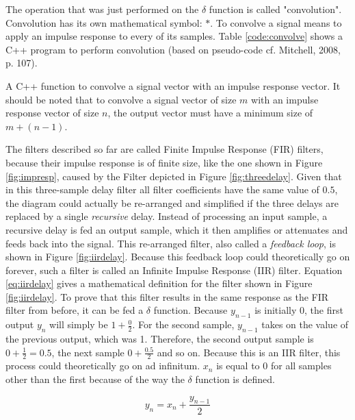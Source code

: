 \noindent The operation that was just performed on the $\delta$ function is called "convolution". Convolution has its own mathematical symbol: $\ast$. To convolve a signal means to apply an impulse response to every of its samples. Table \ref{code:convolve} shows a C++ program to perform convolution (based on pseudo-code cf. Mitchell, 2008, p. 107).\\

\begin{table}
  \caption{A C++ function to convolve a signal vector with an impulse response vector. It should be noted that to convolve a signal vector of size $m$ with an impulse response vector of size $n$, the output vector must have a minimum size of $m + (n - 1)$.}
  \label{code:convolve}
\end{table}

\noindent The filters described so far are called Finite Impulse Response (FIR) filters, because their impulse response is of finite size, like the one shown in Figure \ref{fig:impresp}, caused by the Filter depicted in Figure \ref{fig:threedelay}. Given that in this three-sample delay filter all filter coefficients have the same value of $0.5$, the diagram could actually be re-arranged and simplified if the three delays are replaced by a single \emph{recursive} delay. Instead of processing an input sample, a recursive delay is fed an output sample, which it then amplifies or attenuates and feeds back into the signal. This re-arranged filter, also called a \emph{feedback loop}, is shown in Figure \ref{fig:iirdelay}. Because this feedback loop could theoretically go on forever, such a filter is called an Infinite Impulse Response (IIR) filter. Equation \ref{eq:iirdelay} gives a mathematical definition for the filter shown in Figure \ref{fig:iirdelay}. To prove that this filter results in the same response as the FIR filter from before, it can be fed a $\delta$ function. Because $y_{n-1}$ is initially 0, the first output $y_{n}$ will simply be $1 + \frac{0}{2}$. For the second sample, $y_{n-1}$ takes on the value of the previous output, which was 1. Therefore, the second output sample is $0 + \frac{1}{2} = 0.5$, the next sample $0 + \frac{0.5}{2}$ and so on. Because this is an IIR filter, this process could theoretically go on ad infinitum. $x_{n}$ is equal to 0 for all samples other than the first because of the way the $\delta$ function is defined.

\begin{equation}
  y_{n} = x_{n} + \frac{y_{n-1}}{2}
  \label{eq:iirdelay}
\end{equation}

